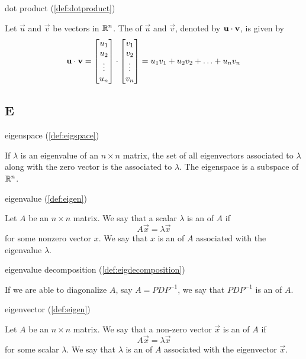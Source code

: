 \documentclass{ximera}
\begin{document}
dot product (\ref{def:dotproduct})
\begin{expandable}{}{}
Let $\vec{u}$ and $\vec{v}$ be vectors in $\mathbb{R}^n$.  The  of $\vec{u}$ and $\vec{v}$, denoted by $\mathbf{u}\cdot \mathbf{v}$, is given by
$$\mathbf{u}\cdot\mathbf{v}=\begin{bmatrix}u_1\\u_2\\\vdots\\u_n\end{bmatrix}\cdot\begin{bmatrix}v_1\\v_2\\\vdots\\v_n\end{bmatrix}=u_1v_1+u_2v_2+\ldots+u_nv_n$$
\end{expandable}


\subsection*{E}

eigenspace (\ref{def:eigspace})
\begin{expandable}{}{}
    If $\lambda$ is an eigenvalue of an $n \times n$ matrix, the set of all eigenvectors associated to $\lambda$ along with the zero vector is the  associated to $\lambda$.  The eigenspace is a subspace of $\mathbb{R}^n$.
\end{expandable}

eigenvalue (\ref{def:eigen})
\begin{expandable}{}{}
    Let $A$ be an $n \times n$ matrix.  We say that a scalar $\lambda$ is an  of $A$ if $$A\vec{x} = \lambda \vec{x}$$
for some nonzero vector $x$.
We say that $x$ is an  of $A$ associated with the eigenvalue $\lambda$.
\end{expandable}

eigenvalue decomposition (\ref{def:eigdecomposition})
\begin{expandable}{}{}
    If we are able to diagonalize $A$, say $A=PDP^{-1}$, we say that $PDP^{-1}$ is an  of $A$.
\end{expandable}

eigenvector (\ref{def:eigen})
\begin{expandable}{}{}
    Let $A$ be an $n \times n$ matrix.  We say that a non-zero vector $\vec{x}$ is an  of $A$ if $$A\vec{x} = \lambda \vec{x}$$
for some scalar $\lambda$.
We say that $\lambda$ is an  of $A$ associated with the eigenvector $\vec{x}$.
\end{expandable}
\end{document}

